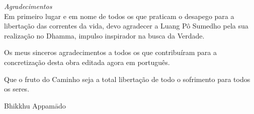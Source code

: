 \cleartorecto
\thispagestyle{empty}

\begin{quotepage}{80mm}
\centering
\textit{Agradecimentos}\\[0.4\baselineskip]
Em primeiro lugar e em nome de todos os que praticam o desapego para a
libertação das correntes da vida, devo agradecer a Luang Pô Sumedho
pela sua realização no Dhamma, impulso inspirador na busca da Verdade.

Os meus sinceros agradecimentos a todos os que contribuíram para a
concretização desta obra editada agora em português.

Que o fruto do Caminho seja a total libertação de todo o sofrimento para
todos os seres.

Bhikkhu Appamādo
\end{quotepage}

